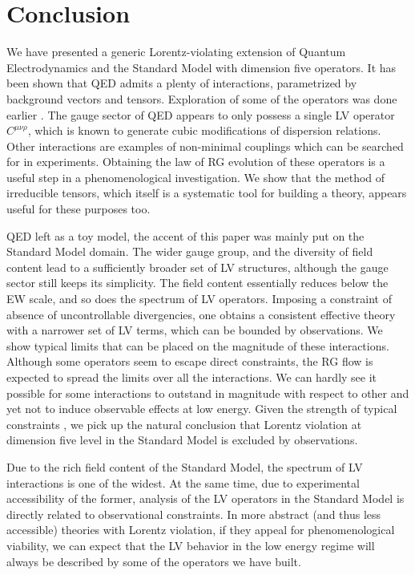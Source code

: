 \documentclass[12pt,preprintnumbers,nofootinbib]{revtex4}
\begin{document}
\section{Conclusion}
	We have presented a generic Lorentz-violating extension of 
	Quantum Electrodynamics and the Standard Model with dimension five operators.
	It has been shown that QED admits a plenty of interactions,
	parametrized by background vectors and tensors.
	Exploration of some of the operators was done earlier
\cite{MP:,Gagnon:2004xh}.
	The gauge sector of QED appears to only possess a single LV
	operator $ C^{\mu\nu\rho} $, which is known to generate cubic
	modifications of dispersion relations.	
	Other interactions are examples of non-minimal couplings which can
	be searched for in experiments.
	Obtaining the law of RG evolution of these operators is a useful step in a 
	phenomenological investigation.
	We show that the method of irreducible tensors, which itself is a systematic
	tool for building a theory, appears useful for these purposes too.

	QED left as a toy model,
	the accent of this paper was mainly put on the Standard Model 
	domain.
	The wider gauge group, and the diversity of field content lead
	to a sufficiently broader set of LV structures, although the gauge
	sector still keeps its simplicity.
	The field content essentially reduces below the EW scale,
	and so does the spectrum of LV operators.
	Imposing a constraint of absence of uncontrollable divergencies,
	one obtains a consistent effective theory with a narrower set of LV terms, which 
	can be bounded by observations.
	We show typical limits that can be placed on the magnitude of these
	interactions.
	Although some operators seem to escape direct constraints, the RG
	flow is expected to spread the limits over all the interactions.
	We can hardly see it possible for some interactions to outstand in magnitude 
	with respect to other and yet not to induce observable effects at low
	energy. 
	Given the strength of typical constraints 
\cite{Gagnon:2004xh}, we pick up the natural 
	conclusion that Lorentz violation at dimension five level in the Standard
	Model is excluded by observations.

	Due to the rich field content of the Standard Model,
	the spectrum of LV interactions is one of the widest.
	At the same time, due to experimental accessibility of the
	former, analysis of the LV operators in the
	Standard Model is directly related to observational constraints.
	In more abstract (and thus less accessible) theories with Lorentz violation, 
	if they appeal for phenomenological
	viability, we can expect that the LV behavior in the low energy regime will 
	always be described by some of the operators we have built.
\end{document}
